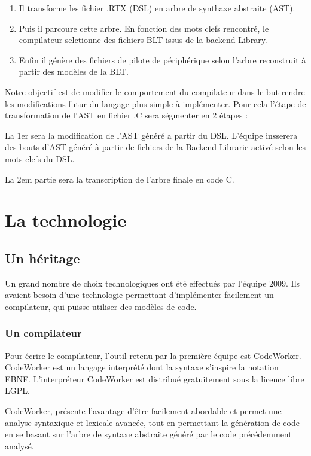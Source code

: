 \documentclass{rtxreport}
\newcommand{\note}[1]{\marginpar{\scriptsize{\textdagger\ #1}}}
\begin{document}
\begin{enumerate}
\item Il transforme les fichier .RTX (DSL) en arbre de synthaxe abstraite (AST).
\item Puis il parcoure cette arbre. En fonction des mots clefs rencontré, 
le compilateur selctionne des fichiers BLT issus de la backend Library.
\item Enfin il génère des fichiers de pilote de périphérique selon l'arbre reconstruit 
à partir des modèles de la BLT.
\end{enumerate}

Notre objectif est de modifier le comportement du compilateur dans le but 
rendre les modifications futur du langage plus simple à implémenter.
Pour cela l'étape de transformation de l'AST en fichier .C sera ségmenter en 2 étapes :

La 1er sera la modification de l'AST généré a partir du DSL. L'équipe insserera des
bouts d'AST généré à partir de fichiers de la Backend Librarie activé selon 
les mots clefs du DSL.

La 2em partie sera la transcription de l'arbre finale en code C.


\chapter{La technologie \rtx\ }

\section{Un héritage}

Un grand nombre de choix technologiques ont été effectués par l'équipe 2009.
Ils avaient besoin d'une technologie permettant d'implémenter facilement un
compilateur, qui puisse utiliser des modèles de code.

\subsection{Un compilateur}

Pour écrire le compilateur, l'outil retenu par la première équipe est
CodeWorker. CodeWorker est un langage interprété dont la syntaxe s'inspire la
notation EBNF. L'interpréteur CodeWorker est distribué gratuitement sous la
licence libre LGPL.\note{REFERENCE NEEDED}

CodeWorker, présente l'avantage d'être facilement abordable et permet une
analyse syntaxique et lexicale avancée, tout en permettant la génération de
code en se basant sur l'arbre de syntaxe abstraite généré par le code
précédemment analysé\note{EPHRASETOOLONG}.
\end{document}
